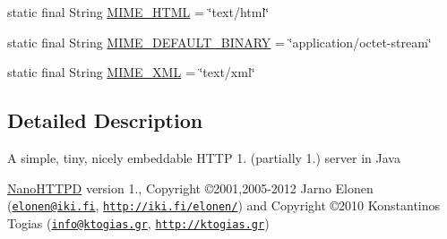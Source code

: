 \begin{DoxyCompactItemize}
\item 
static final \-String \hyperlink{classcom_1_1axcoto_1_1shinjuku_1_1maki_1_1_nano_h_t_t_p_d_a3d8fab33f7c95d7e6fcb24eccb1fd272}{\-M\-I\-M\-E\-\_\-\-H\-T\-M\-L} = \char`\"{}text/html\char`\"{}
\item 
static final \-String \hyperlink{classcom_1_1axcoto_1_1shinjuku_1_1maki_1_1_nano_h_t_t_p_d_a05c5766458322cd31d273850f2fba795}{\-M\-I\-M\-E\-\_\-\-D\-E\-F\-A\-U\-L\-T\-\_\-\-B\-I\-N\-A\-R\-Y} = \char`\"{}application/octet-\/stream\char`\"{}
\item 
static final \-String \hyperlink{classcom_1_1axcoto_1_1shinjuku_1_1maki_1_1_nano_h_t_t_p_d_ae9d5aaabf2bf7a399d7b94e6f8956e8a}{\-M\-I\-M\-E\-\_\-\-X\-M\-L} = \char`\"{}text/xml\char`\"{}
\end{DoxyCompactItemize}


\subsection{\-Detailed \-Description}
\-A simple, tiny, nicely embeddable \-H\-T\-T\-P 1. (partially 1.) server in \-Java

\hyperlink{classcom_1_1axcoto_1_1shinjuku_1_1maki_1_1_nano_h_t_t_p_d}{\-Nano\-H\-T\-T\-P\-D} version 1., \-Copyright \copyright 2001,2005-\/2012 \-Jarno \-Elonen (\href{mailto:elonen@iki.fi}{\tt elonen@iki.\-fi}, \href{http://iki.fi/elonen/}{\tt http\-://iki.\-fi/elonen/}) and \-Copyright \copyright 2010 \-Konstantinos \-Togias (\href{mailto:info@ktogias.gr}{\tt info@ktogias.\-gr}, \href{http://ktogias.gr}{\tt http\-://ktogias.\-gr})

